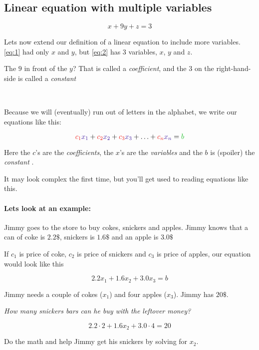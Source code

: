 \documentclass{article}
\begin{document}
\subsection{Linear equation with multiple variables}

\begin{equation} \label{eq:2}
x + 9y + z = 3
\end{equation}

Lets now extend our definition of a linear equation to include more variables. \eqref{eq:1} had only $x$ and $y$, but \eqref{eq:2} has 3 variables, $x$, $y$ and $z$. 

The $9$ in front of the $y$? That is called a \textit{coefficient}, and the $3$ on the right-hand-side is called a \textit{constant}

\

Because we will (eventually) run out of letters in the alphabet, we write our equations like this:

\[
\color{rooj}c_1\color{blou}x_1\color{black} + \color{rooj}c_2\color{blou}x_2\color{black} + \color{rooj}c_3\color{blou}x_3\color{black} + \dots\color{black} + \color{rooj}c_n\color{blou}x_n\color{black} = \color{groen} b \color{black}
\]

Here the $c$'s are the \color{rooj} \textit{coefficients}\color{black}, the $x$'s are the \color{blou}  \textit{variables} \color{black}  and the $b$ is (spoiler) the \color{groen} \textit{constant} \color{black} . 

It may look complex the first time, but you'll get used to reading equations like this.

\paragraph{Lets look at an example:}

Jimmy goes to the store to buy cokes, snickers and apples. Jimmy knows that a can of coke is $2.2\$$, snickers is $1.6\$$ and an apple is $3.0\$$

If $c_1$ is price of coke, $c_2$ is price of snickers and $c_3$ is price of apples, our equation would look like this

\[
2.2x_1 + 1.6x_2 + 3.0x_3 = b
\]

Jimmy needs a couple of cokes ($x_1$) and four apples ($x_3$). Jimmy has $20\$$.

\textit{How many snickers bars can he buy with the leftover money?}

\[
2.2\cdot 2 + 1.6x_2 + 3.0\cdot 4 = 20
\]

Do the math and help Jimmy get his snickers by solving for $x_2$. 
\end{document}
